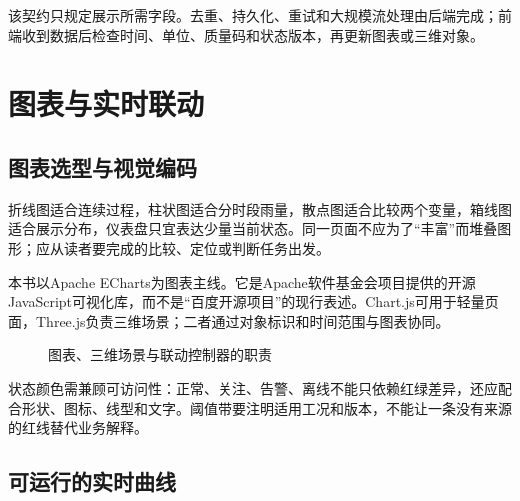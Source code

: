 该契约只规定展示所需字段。去重、持久化、重试和大规模流处理由后端完成；前端收到数据后检查时间、单位、质量码和状态版本，再更新图表或三维对象。

\section{图表与实时联动}\label{sec:data-chart-display}

\subsection{图表选型与视觉编码}

折线图适合连续过程，柱状图适合分时段雨量，散点图适合比较两个变量，箱线图适合展示分布，仪表盘只宜表达少量当前状态。同一页面不应为了“丰富”而堆叠图形；应从读者要完成的比较、定位或判断任务出发。

本书以Apache ECharts为图表主线。它是Apache软件基金会项目提供的开源JavaScript可视化库，而不是“百度开源项目”的现行表述\cite{apacheECharts}。Chart.js可用于轻量页面，Three.js负责三维场景；二者通过对象标识和时间范围与图表协同。

\begin{figure}[htbp]
\centering
{}
\caption{图表、三维场景与联动控制器的职责}
\label{fig:chart-technology-selection}
\end{figure}

状态颜色需兼顾可访问性：正常、关注、告警、离线不能只依赖红绿差异，还应配合形状、图标、线型和文字。阈值带要注明适用工况和版本，不能让一条没有来源的红线替代业务解释。

\subsection{可运行的实时曲线}

